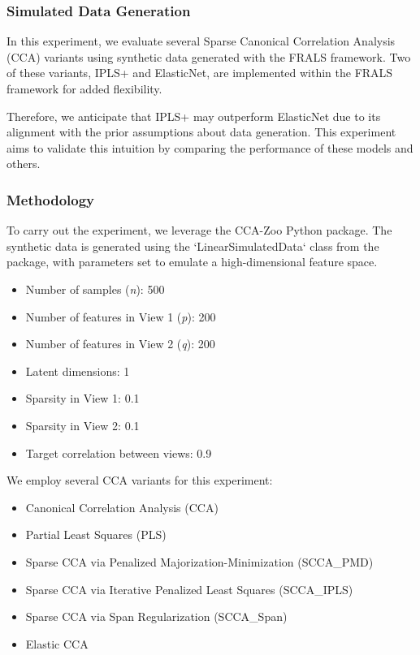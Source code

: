 \subsubsection{Simulated Data Generation}\label{subsubsec:simulated-data-generation}



In this experiment, we evaluate several Sparse Canonical Correlation Analysis (CCA) variants using synthetic data generated with the FRALS framework. Two of these variants, IPLS+ and ElasticNet, are implemented within the FRALS framework for added flexibility.

Therefore, we anticipate that IPLS+ may outperform ElasticNet due to its alignment with the prior assumptions about data generation. This experiment aims to validate this intuition by comparing the performance of these models and others.

\subsubsection{Methodology}

To carry out the experiment, we leverage the CCA-Zoo Python package. The synthetic data is generated using the `LinearSimulatedData` class from the package, with parameters set to emulate a high-dimensional feature space.

\begin{itemize}
    \item Number of samples (\textit{n}): 500
    \item Number of features in View 1 (\textit{p}): 200
    \item Number of features in View 2 (\textit{q}): 200
    \item Latent dimensions: 1
    \item Sparsity in View 1: 0.1
    \item Sparsity in View 2: 0.1
    \item Target correlation between views: 0.9
\end{itemize}

We employ several CCA variants for this experiment:
\begin{itemize}
    \item Canonical Correlation Analysis (CCA)
    \item Partial Least Squares (PLS)
    \item Sparse CCA via Penalized Majorization-Minimization (SCCA\_PMD)
    \item Sparse CCA via Iterative Penalized Least Squares (SCCA\_IPLS)
    \item Sparse CCA via Span Regularization (SCCA\_Span)
    \item Elastic CCA
\end{itemize}

